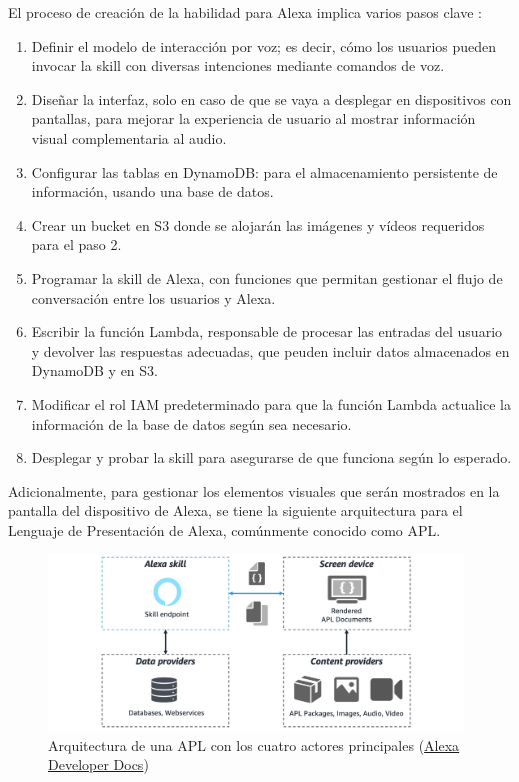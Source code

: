 \newpage

El proceso de creación de la habilidad para Alexa implica varios pasos clave \parencite{arquitecturaSkill}:
\begin{enumerate}
	\item Definir el modelo de interacción por voz; es decir, cómo los usuarios pueden invocar la skill con diversas intenciones mediante comandos de voz.
	\item Diseñar la interfaz, solo en caso de que se vaya a desplegar en dispositivos con pantallas, para mejorar la experiencia de usuario al mostrar información visual complementaria al audio.
	\item Configurar las tablas en DynamoDB: para el almacenamiento persistente de información, usando una base de datos.
	\item Crear un bucket en S3 donde se alojarán las imágenes y vídeos requeridos para el paso 2.
	\item Programar la skill de Alexa, con funciones que permitan gestionar el flujo de conversación entre los usuarios y Alexa.
	\item Escribir la función Lambda, responsable de procesar las entradas del usuario y devolver las respuestas adecuadas, que peuden incluir datos almacenados en DynamoDB y en S3.
	\item Modificar el rol IAM predeterminado para que la función Lambda actualice la información de la base de datos según sea necesario.
	\item Desplegar y probar la skill para asegurarse de que funciona según lo esperado.
\end{enumerate}

Adicionalmente, para gestionar los elementos visuales que serán mostrados en la pantalla del dispositivo de Alexa, se tiene la siguiente arquitectura para el Lenguaje de Presentación de Alexa, comúnmente conocido como APL.

\begin{figure}[H]
	\centering
	\includegraphics[width=0.98\textwidth]{imgs/arquitectura-apl.png}
	\caption{Arquitectura de una APL con los cuatro actores principales (\href{https://developer.amazon.com/en-US/docs/alexa/alexa-presentation-language/apl-bp-understand-apl-architecture.html}{Alexa Developer Docs})}
\label{fig:arquitectura-apl}
\end{figure}

